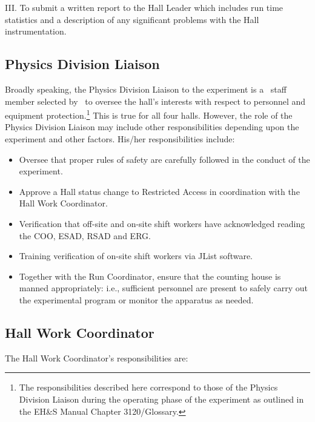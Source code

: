 \documentclass[10pt]{article}
\begin{document}
\noindent III. To submit a written report to the Hall Leader which includes
run time statistics and a description of any significant problems with the
Hall instrumentation.


\subsection{Physics Division Liaison}

Broadly speaking, the Physics Division Liaison to the experiment
is a \HALL\ staff member selected by \HALLLEADER\
to oversee the hall's interests with respect to personnel and equipment
protection.\footnote{The responsibilities described here correspond
to those of the Physics Division Liaison during
the operating phase of the experiment as outlined in the
EH\&S Manual Chapter 3120/Glossary.}
This is true for all four halls. However, the role of
the Physics Division Liaison may include other responsibilities
depending upon the experiment and other factors. His/her responsibilities
include:
\begin{itemize}
\item Oversee that proper rules of safety are carefully followed in the
conduct of the experiment.
\item Approve a Hall status change to Restricted Access in coordination
with the Hall Work Coordinator.
\item Verification that off-site and on-site shift workers have acknowledged reading the COO, ESAD, RSAD and ERG.
\item Training verification of on-site shift workers via JList software.
\item Together with the Run Coordinator, 
ensure that the counting house is manned appropriately: i.e.,
sufficient personnel are present to safely carry out the experimental 
program or monitor the apparatus as needed.
\end{itemize}

\subsection{Hall Work Coordinator}

The Hall Work Coordinator's responsibilities are:
\end{document}
